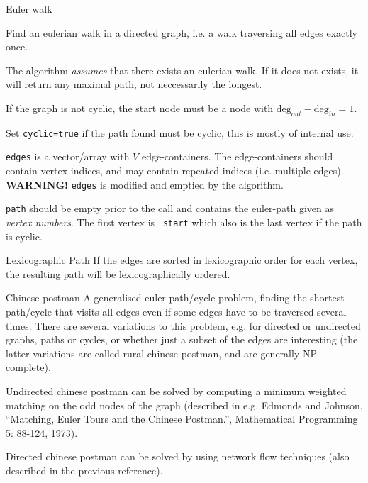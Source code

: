 
\begin{algorithm}{Euler walk}

\desc
Find an eulerian walk in a directed graph, i.e. a walk traversing all
edges exactly once.

The algorithm \emph{assumes} that there exists an eulerian walk. If it
does not exists, it will return any maximal path, not neccessarily the
longest.

If the graph is not cyclic, the start node must be a node with
$\mathrm{deg}_{out}-\mathrm{deg}_{in} = 1$.

Set {\tt cyclic=true} if the path found must be cyclic, this is mostly
of internal use.

{\tt edges} is a vector/array with $V$ edge-containers. The
edge-containers should contain vertex-indices, and may contain
repeated indices (i.e. multiple edges). {\bf WARNING!} {\tt edges} is
modified and emptied by the algorithm.

{\tt path} should be empty prior to the call and contains the
euler-path given as \emph{vertex numbers}. The first vertex is {\tt
start} which also is the last vertex if the path is cyclic.

\item[Lexicographic Path] If the edges are sorted in lexicographic order for
each vertex, the resulting path will be lexicographically
ordered. 
\end{algorithm}

\begin{algorithm}{Chinese postman}
\desc
A generalised euler path/cycle problem, finding the shortest
path/cycle that visits all edges even if some edges have to be
traversed several times.  There are several variations to this
problem, e.g. for directed or undirected graphs, paths or cycles, or
whether just a subset of the edges are interesting (the latter
variations are called rural chinese postman, and are generally
NP-complete).

Undirected chinese postman can be solved by computing a minimum
weighted matching on the odd nodes of the graph (described in
e.g. Edmonds and Johnson, ``Matching, Euler Tours and the Chinese
Postman.'', Mathematical Programming 5: 88-124, 1973).

Directed chinese postman can be solved by using network flow
techniques (also described in the previous reference).
\end{algorithm}

